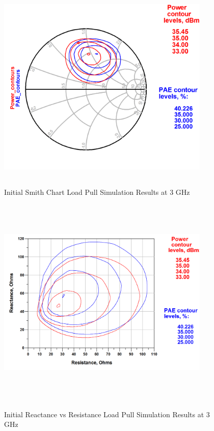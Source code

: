 \begin{figure}
  \centering
  \includegraphics[width=4in,height=4in,keepaspectratio]{figures/simulation/pae_pout_smith_cont_fund}\\
  \caption{Initial Smith Chart Load Pull Simulation Results at 3 GHz}
  \label{fig:smith_fund_load}

  \vspace*{\floatsep}

  \centering
  \includegraphics[width=4in,height=4in,keepaspectratio]{figures/simulation/pae_pout_res_cont_fund}\\
  \caption{Initial Reactance vs Resistance Load Pull Simulation Results at 3 GHz}
  \label{fig:xy_fund_load}
\end{figure}

